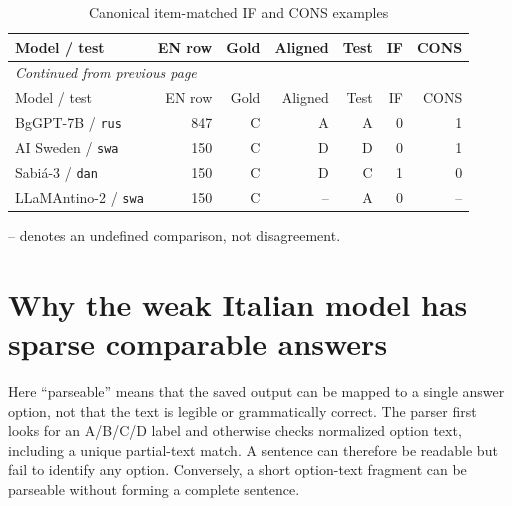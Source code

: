 \begingroup\footnotesize\setlength{\tabcolsep}{4pt}\renewcommand{\arraystretch}{1.15}
\begin{longtable}{lrrrrrr}
\caption{Canonical item-matched IF and CONS examples}
\label{tab:belebele-scoring-examples} \\

\toprule
Model / test & EN row & Gold & Aligned & Test & IF & CONS \\
\midrule
\endfirsthead
\multicolumn{7}{l}{\textit{Continued from previous page}}\\
\toprule
Model / test & EN row & Gold & Aligned & Test & IF & CONS \\
\midrule
\endhead


BgGPT-7B / \texttt{rus} & 847 & C & A & A & 0 & 1 \\

AI Sweden / \texttt{swa} & 150 & C & D & D & 0 & 1 \\

Sabi\'a-3 / \texttt{dan} & 150 & C & D & C & 1 & 0 \\

LLaMAntino-2 / \texttt{swa} & 150 & C & -- & A & 0 & -- \\

\bottomrule

\end{longtable}

\par\smallskip\footnotesize -- denotes an undefined comparison, not disagreement.

\endgroup



\clearpage


\section{Why the weak Italian model has sparse comparable answers}
\label{app:belebele-sparse-answers}

Here ``parseable'' means that the saved output can be mapped to a single answer option, not that the text is legible or grammatically correct. The parser first looks for an A/B/C/D label and otherwise checks normalized option text, including a unique partial-text match. A sentence can therefore be readable but fail to identify any option. Conversely, a short option-text fragment can be parseable without forming a complete sentence.

